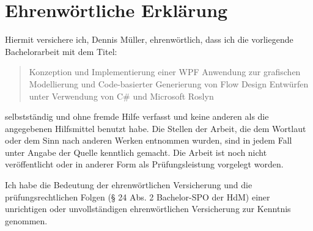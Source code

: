 
\chapter*{Ehrenwörtliche Erklärung}

Hiermit versichere ich, Dennis Müller, ehrenwörtlich, dass ich die vorliegende Bachelorarbeit  mit dem Titel: 

\begin{quote}
	Konzeption und Implementierung einer WPF Anwendung zur grafischen Modellierung und	Code-basierter Generierung von Flow Design Entwürfen unter Verwendung von C\# und Microsoft Roslyn 
\end{quote}


selbstständig und ohne fremde Hilfe verfasst und keine anderen als die angegebenen Hilfsmittel benutzt habe. Die Stellen der Arbeit, die dem Wortlaut oder dem Sinn nach anderen Werken entnommen wurden, sind in jedem Fall unter Angabe der Quelle kenntlich gemacht. Die Arbeit ist noch nicht veröffentlicht oder in anderer Form als Prüfungsleistung vorgelegt worden.

\vspace{0.5cm}

Ich habe die Bedeutung der ehrenwörtlichen Versicherung und die prüfungsrechtlichen Folgen (§ 24 Abs. 2 Bachelor-SPO der HdM) einer unrichtigen oder unvollständigen ehrenwörtlichen Versicherung zur Kenntnis genommen.
\vspace{1.5cm}



